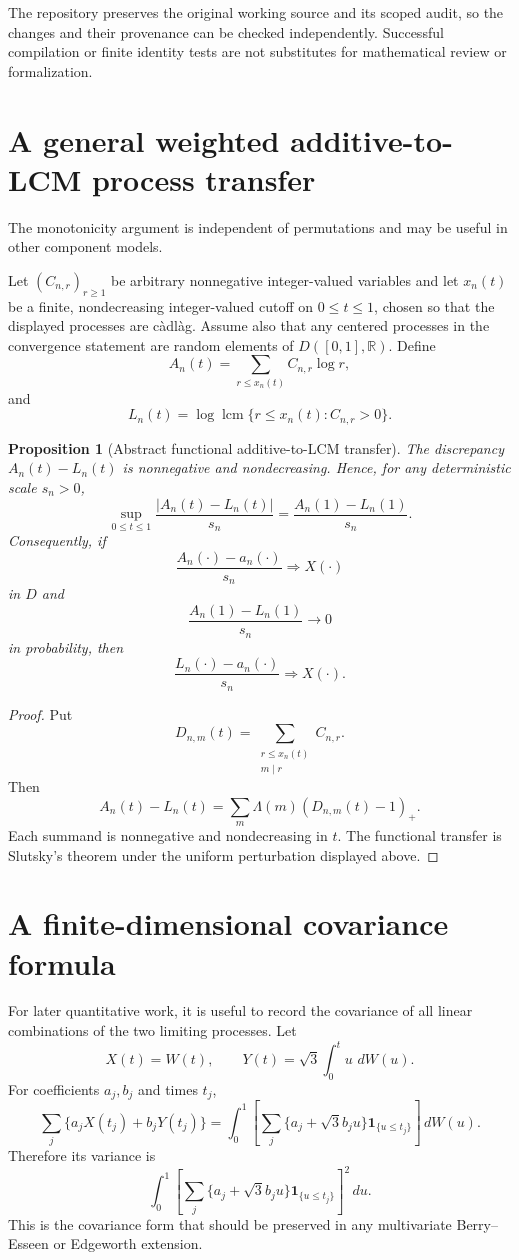 \documentclass[11pt]{article}
\newtheorem{proposition}[theorem]{Proposition}
\theoremstyle{definition}
\theoremstyle{remark}
\newcommand{\one}{\mathbf 1}
\newcommand{\dd}{\,d}
\newcommand{\lcm}{\operatorname{lcm}}
\newcommand{\R}{\mathbb R}
\begin{document}
The repository preserves the original working source and its scoped audit,
so the changes and their provenance can be checked independently. Successful
compilation or finite identity tests are not substitutes for mathematical
review or formalization.

\appendix

\section{A general weighted additive-to-LCM process transfer}

The monotonicity argument is independent of permutations and may be useful in
other component models.

Let $(C_{n,r})_{r\ge1}$ be arbitrary nonnegative integer-valued variables and
let $x_n(t)$ be a finite, nondecreasing integer-valued cutoff on
$0\le t\le1$, chosen so that the displayed processes are c\`adl\`ag.
Assume also that any centered processes in the convergence statement are
random elements of $D([0,1],\R)$. Define
\[
 A_n(t)=\sum_{r\le x_n(t)}C_{n,r}\log r,
\]
and
\[
 L_n(t)=\log\lcm\{r\le x_n(t):C_{n,r}>0\}.
\]

\begin{proposition}[Abstract functional additive-to-LCM transfer]
\label{prop:abstract-transfer}
The discrepancy $A_n(t)-L_n(t)$ is nonnegative and nondecreasing.  Hence, for
any deterministic scale $s_n>0$,
\[
 \sup_{0\le t\le1}\frac{|A_n(t)-L_n(t)|}{s_n}
 =\frac{A_n(1)-L_n(1)}{s_n}.
\]
Consequently, if
\[
 \frac{A_n(\cdot)-a_n(\cdot)}{s_n}\Rightarrow X(\cdot)
\]
in $D$ and
\[
 \frac{A_n(1)-L_n(1)}{s_n}\longrightarrow0
\]
in probability, then
\[
 \frac{L_n(\cdot)-a_n(\cdot)}{s_n}\Rightarrow X(\cdot).
\]
\end{proposition}

\begin{proof}
Put
\[
 D_{n,m}(t)=\sum_{\substack{r\le x_n(t)\\m\mid r}}C_{n,r}.
\]
Then
\[
 A_n(t)-L_n(t)
 =\sum_m\Lambda(m)(D_{n,m}(t)-1)_+.
\]
Each summand is nonnegative and nondecreasing in $t$.  The functional transfer
is Slutsky's theorem under the uniform perturbation displayed above.
\end{proof}

\section{A finite-dimensional covariance formula}

For later quantitative work, it is useful to record the covariance of all
linear combinations of the two limiting processes.  Let
\[
 X(t)=W(t),
 \qquad
 Y(t)=\sqrt3\int_0^t u\,\dd W(u).
\]
For coefficients $a_j,b_j$ and times $t_j$,
\[
 \sum_j\{a_jX(t_j)+b_jY(t_j)\}
 =\int_0^1
 \left[
 \sum_j\{a_j+\sqrt3b_ju\}\one_{\{u\le t_j\}}
 \right]\dd W(u).
\]
Therefore its variance is
\begin{equation}\label{eq:general-variance}
 \int_0^1
 \left[
 \sum_j\{a_j+\sqrt3b_ju\}\one_{\{u\le t_j\}}
 \right]^2\dd u.
\end{equation}
This is the covariance form that should be preserved in any multivariate
Berry--Esseen or Edgeworth extension.
\end{document}
